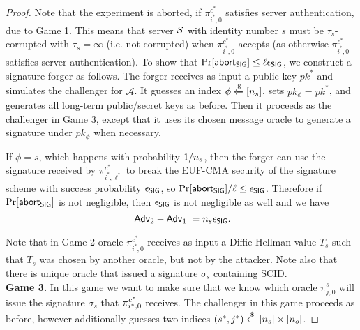 \begin{proof}
 Note that the experiment is aborted, if $\pi^{c^{\ast}}_{i^{\ast},0}$ satisfies server authentication, due to Game 1. This means that server $\mathcal{S}$ with identity number $s$ must be $\tau_s$-corrupted with $\tau_s = \infty$ (i.e. not corrupted) when $\pi^{c^{\ast}}_{i^{\ast},0}$ accepts (as otherwise $\pi^{c^{\ast}}_{i^{\ast},0}$ satisfies server authentication). To show that $\Pr[\mathsf{abort}_{\mathsf{SIG}}] \leq \ell \epsilon_{\mathsf{SIG}}$, we construct a signature forger as follows. The forger receives as input a public key $pk^{\ast}$ and simulates the challenger for $\mathcal{A}$. It guesses an index $\phi \xleftarrow{\$}[n_s]$, sets $pk_{\phi} = pk^{\ast}$, and generates all long-term public/secret keys as before. Then it proceeds as the challenger in Game 3, except that it uses its chosen message oracle to generate a signature under $pk_{\phi}$ when necessary.

 If $\phi = s$, which happens with probability $1/n_s$, then the forger can use the signature received by $\pi^{c^{\ast}}_{i^{\ast},\ell^{\ast}}$ to break the EUF-CMA security of the signature scheme with success probability $\epsilon_{\mathsf{SIG}}$, so $\Pr[\mathsf{abort}_{\mathsf{SIG}}]/\ell \leq \epsilon_{\mathsf{SIG}}$. Therefore if $\Pr[\mathsf{abort}_{\mathsf{SIG}}]$ is not negligible, then $\epsilon_{\mathsf{SIG}}$ is not negligible as well and we have
 \begin{equation}
  |\mathsf{Adv}_2 - \mathsf{Adv}_1| = n_s \epsilon_{\mathsf{SIG}}.
 \end{equation}%

 Note that in Game 2 oracle $\pi^{c^{\ast}}_{i^{\ast},0}$ receives as input a Diffie-Hellman value $T_s$ such that $T_s$ was chosen by another oracle, but not by the attacker. Note also that there is unique oracle that issued a signature $\sigma_s$ containing SCID.
\vspace{10pt}\\%
%
%
 \textbf{Game 3.} In this game we want to make sure that we know which oracle $\pi^s_{j,0}$ will issue the signature $\sigma_s$ that $\pi^{c^{\ast}}_{i^{\ast},0}$ receives. The challenger in this game proceeds as before, however additionally guesses two indices $(s^{\ast}, j^{\ast}) \xleftarrow{\$} [n_s] \times [n_o]$.


\end{proof}
